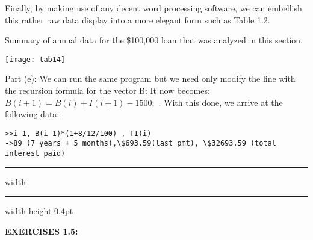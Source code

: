 \documentclass[../main.tex]{subfiles}
\begin{document}
Finally, by making use of any decent word processing software, we can embellish
this rather raw data display into a more elegant form such as Table 1.2. 

\begin{table}[H]
\caption{Summary of annual data for the \$100,000 loan that was analyzed in this
section. 
  }
\centering
\texttt{[image: tab14]}
\label{tab:tab_1_4}
\end{table}

Part (e): We can run the same program but we need only modify the line with the 
recursion formula for the vector B: It now becomes:$ B(i + 1) = B(i)+I( i + 1)-1500;$ . With this done, we arrive at the following data: 

\begin{verbatim}
>>i-1, B(i-1)*(1+8/12/100) , TI(i)
->89 (7 years + 5 months),\$693.59(last pmt), \$32693.59 (total interest paid)

\end{verbatim}

\hrule width \hsize \kern 1pt \hrule width \hsize height 0.4pt

\hspace{0.1cm}

\textbf{EXERCISES 1.5: }
\end{document}
